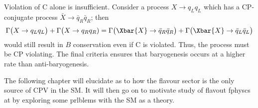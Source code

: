 Violation of C alone is insufficient.
Consider a process $X\to q_Lq_L$ which has a CP-conjugate process $\bar X\to \bar q_R\bar q_R$;
then
\begin{equation}
  \Gamma\big(X\to q_Lq_L\big) + \Gamma\big(X\to q_Rq_R)
  =
  \Gamma\big(\Xbar{X}\to \bar q_R\bar q_R\big) + \Gamma\big(\Xbar{X}\to \bar q_L\bar q_L\big)
\end{equation}
would still result in $B$ conservation even if C is violated.
Thus, the process must be CP violating.
The final criteria ensures that baryogenesis occurs at a higher rate than anti-baryogenesis.

The following chapter will elucidate as to how the flavour sector is the only source of CPV in the
SM.
It will then go on to motivate study of flavout fphyscs at \lhcb by exploring some prlblems with
the SM as a theory.






